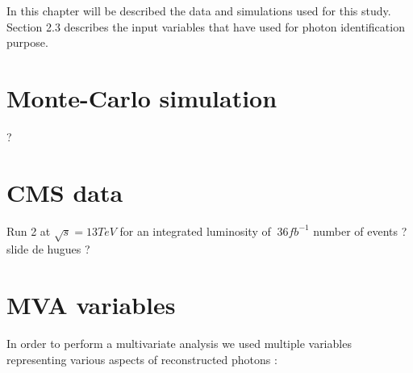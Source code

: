 \label{sec:unchapitre}

In this chapter will be described the data and simulations used for this study. Section 2.3 describes the input
variables that have used for photon identification purpose.

\section{Monte-Carlo simulation}

?

\section{CMS data}

Run 2 at $\sqrt{s} = 13 TeV$ for an integrated luminosity of $~ 36 fb^{-1}$
number of events ? slide de hugues ?

\section{MVA variables}

In order to perform a multivariate analysis we used multiple variables representing various aspects of reconstructed
photons :

